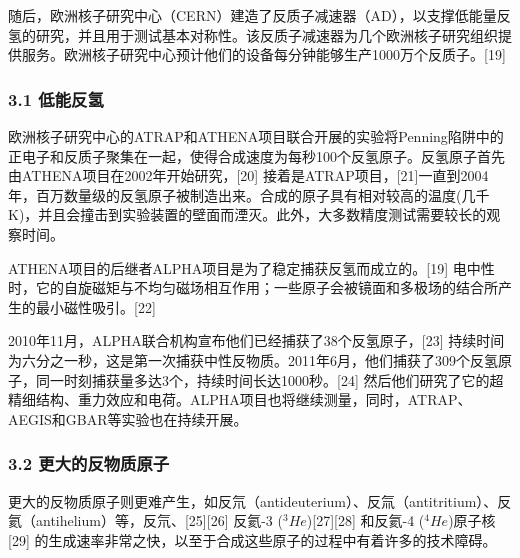 随后，欧洲核子研究中心（CERN）建造了反质子减速器（AD），以支撑低能量反氢的研究，并且用于测试基本对称性。该反质子减速器为几个欧洲核子研究组织提供服务。欧洲核子研究中心预计他们的设备每分钟能够生产1000万个反质子。[19]
\subsubsection{3.1 低能反氢}
欧洲核子研究中心的ATRAP和ATHENA项目联合开展的实验将Penning陷阱中的正电子和反质子聚集在一起，使得合成速度为每秒100个反氢原子。反氢原子首先由ATHENA项目在2002年开始研究，[20] 接着是ATRAP项目，[21]一直到2004年，百万数量级的反氢原子被制造出来。合成的原子具有相对较高的温度(几千K)，并且会撞击到实验装置的壁面而湮灭。此外，大多数精度测试需要较长的观察时间。

ATHENA项目的后继者ALPHA项目是为了稳定捕获反氢而成立的。[19] 电中性时，它的自旋磁矩与不均匀磁场相互作用；一些原子会被镜面和多极场的结合所产生的最小磁性吸引。[22]

2010年11月，ALPHA联合机构宣布他们已经捕获了38个反氢原子，[23] 持续时间为六分之一秒，这是第一次捕获中性反物质。2011年6月，他们捕获了309个反氢原子，同一时刻捕获量多达3个，持续时间长达1000秒。[24] 然后他们研究了它的超精细结构、重力效应和电荷。ALPHA项目也将继续测量，同时，ATRAP、AEGIS和GBAR等实验也在持续开展。
\subsubsection{3.2 更大的反物质原子}
更大的反物质原子则更难产生，如反氘（antideuterium）、反氚（antitritium）、反氦（antihelium）等，反氘、[25][26] 反氦-3 ($^3He$)[27][28] 和反氦-4 ($^4He$)原子核[29] 的生成速率非常之快，以至于合成这些原子的过程中有着许多的技术障碍。

